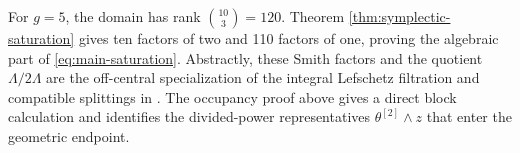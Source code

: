 For \(g=5\), the domain has rank \(\binom{10}{3}=120\).  Theorem
\ref{thm:symplectic-saturation} gives ten factors of two and 110 factors of
one, proving the algebraic part of \eqref{eq:main-saturation}.  Abstractly,
these Smith factors and the quotient \(\Lambda/2\Lambda\) are the
off-central specialization of the integral Lefschetz filtration and
compatible splittings in
\cite[Theorem~2.9, Corollary~2.10, and Proposition~2.14]{FaulknerMiller}.
The occupancy proof above gives a direct block calculation and identifies
the divided-power representatives \(\theta^{[2]}\wedge z\) that enter the
geometric endpoint.
